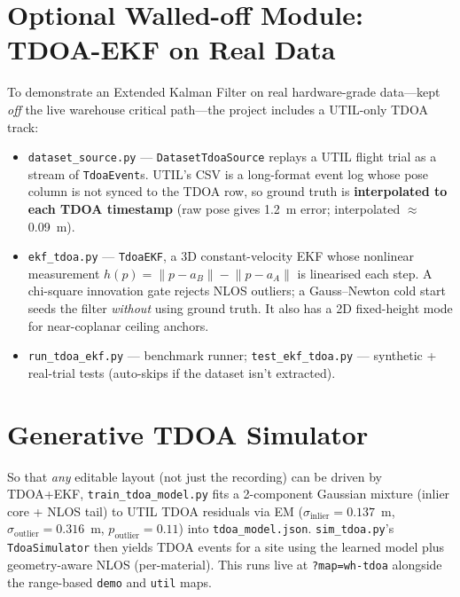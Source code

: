 \documentclass[a4paper,12pt,onecolumn]{report}
\begin{document}
\section{Optional Walled-off Module: TDOA-EKF on Real Data}
To demonstrate an Extended Kalman Filter on real hardware-grade data---kept
\emph{off} the live warehouse critical path---the project includes a UTIL-only
TDOA track:
\begin{itemize}[nosep]
  \item \texttt{dataset\_source.py} --- \texttt{DatasetTdoaSource} replays a UTIL
        flight trial as a stream of \texttt{TdoaEvent}s. UTIL's CSV is a
        long-format event log whose pose column is not synced to the TDOA row, so
        ground truth is \textbf{interpolated to each TDOA timestamp} (raw pose
        gives 1.2~m error; interpolated $\approx$0.09~m).
  \item \texttt{ekf\_tdoa.py} --- \texttt{TdoaEKF}, a 3D constant-velocity EKF
        whose nonlinear measurement $h(p)=\lVert p-a_B\rVert-\lVert p-a_A\rVert$
        is linearised each step. A chi-square innovation gate rejects NLOS
        outliers; a Gauss--Newton cold start seeds the filter \emph{without}
        using ground truth. It also has a 2D fixed-height mode for near-coplanar
        ceiling anchors.
  \item \texttt{run\_tdoa\_ekf.py} --- benchmark runner; \texttt{test\_ekf\_tdoa.py}
        --- synthetic + real-trial tests (auto-skips if the dataset isn't extracted).
\end{itemize}

\section{Generative TDOA Simulator}
So that \emph{any} editable layout (not just the recording) can be driven by
TDOA+EKF, \texttt{train\_tdoa\_model.py} fits a 2-component Gaussian mixture
(inlier core + NLOS tail) to UTIL TDOA residuals via EM
($\sigma_{\text{inlier}}=0.137$~m, $\sigma_{\text{outlier}}=0.316$~m,
$p_{\text{outlier}}=0.11$) into \texttt{tdoa\_model.json}.
\texttt{sim\_tdoa.py}'s \texttt{TdoaSimulator} then yields TDOA events for a site
using the learned model plus geometry-aware NLOS (per-material). This runs live
at \texttt{?map=wh-tdoa} alongside the range-based \texttt{demo} and \texttt{util}
maps.

\end{document}
